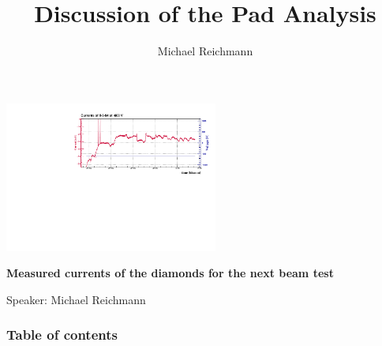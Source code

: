 \documentclass[9pt]{beamer}
\title[Analysis]{Discussion of the Pad Analysis}
\author[M. Reichmann]{Michael Reichmann}
\institute[\textbf{\textit{ETH}}\scalebox{.6}{\textit{Z\"{u}rich}}]{Swiss Federal Institute of Technology Zurich}
\begin{document}
\begin{frame}
	\begin{center}
		\includegraphics[angle=270, width=7cm]{II-6-94_-600}
	\end{center}
	\begin{alertblock}{
		\begin{center}
			\textbf{Measured currents of the diamonds for the next beam test}
		\end{center}}
		\vspace*{10pt}
		\begin{center}\small
		Speaker: Michael Reichmann
		\end{center}\normalsize
	\end{alertblock}
\end{frame}
\usebackgroundtemplate{}
\begin{frame}[allowframebreaks]
	\frametitle{Table of contents}
	\tableofcontents   %
\end{frame}
\end{document}
